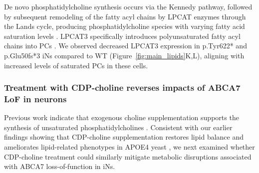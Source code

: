De novo phosphatidylcholine synthesis occurs via the Kennedy pathway, followed by subsequent remodeling of the fatty acyl chains by LPCAT enzymes through the Lands cycle, producing phosphatidylcholine species with varying fatty acid saturation levels \cite{Boumann2003-ew;Wang2019-om}. LPCAT3 specifically introduces polyunsaturated fatty acyl chains into PCs \cite{Zhao2008-pq}. We observed decreased LPCAT3 expression in p.Tyr622* and p.Glu50fs*3 iNs compared to WT (Figure~\ref{fig:main_lipids}K,L), aligning with increased levels of saturated PCs in these cells. \newcommand{\quoteH}{\textcolor{blue}{Overall, ABCA7 LoF iNs accumulate neutral lipids, including long-chain polyunsaturated triglycerides and sterol lipids (ZyE), and show imbalances in phosphatidylcholine composition, with higher saturated and monounsaturated species. \label{quoteH-label}}}


\subsubsection{Treatment with CDP-choline reverses impacts of ABCA7 LoF in neurons}
Previous work indicate that exogenous choline supplementation supports the synthesis of unsaturated phosphatidylcholines \cite{Boumann2003-ew}. Consistent with our earlier findings showing that CDP-choline supplementation restores lipid balance and ameliorates lipid-related phenotypes in APOE4 yeast \cite{Sienski2021-zt}, we next examined whether CDP-choline treatment could similarly mitigate metabolic disruptions associated with ABCA7 loss-of-function in iNs.

\newcommand{\quoteD}{\textcolor{blue}{Targeted LC-MS analysis confirmed CDP-choline increased from undetectable to detectable levels in the media following treatment (Figure~\ref{fig:choline_treatment}A). Additionally, both CDP and choline specifically accumulated in media conditioned by p.Tyr622* cells after treatment (Figure~\ref{fig:choline_treatment}A), indicating extracellular hydrolysis of CDP-choline. Intracellular detection of CDP and CDP-choline was not reliable in this experiment. However, intracellular choline levels significantly increased after treatment (Figure~\ref{fig:choline_treatment}B), confirming cellular uptake likely mediated by choline transporters, whose mRNA levels were significantly elevated after treatment (Figure~\ref{fig:main_choline}C), suggesting that choline was successfully taken up by p.Tyr622* iNs upon treatment.\label{quoteD-label}}} 

